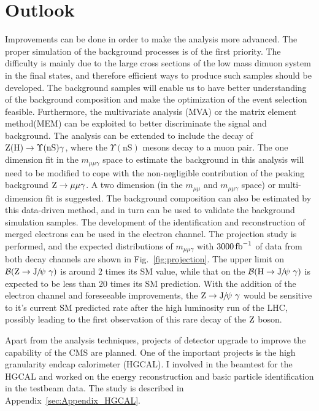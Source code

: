 \section{Outlook}
Improvements can be done in order to make the analysis more advanced. The proper simulation of the background processes is of the first priority. The difficulty is mainly due to the large cross sections of the low mass dimuon system in the final states, and therefore efficient ways to produce such samples should be developed. The background samples will enable us to have better understanding of the background composition and make the optimization of the event selection feasible. Furthermore, the multivariate analysis (MVA) or the matrix element method\footnotemark (MEM) can be exploited to better discriminate the signal and background. 
The analysis can be extended to include the decay of $\mathrm{Z}(\mathrm{H})\to\Upsilon(\text{nS})\gamma$, where the $\Upsilon(\text{nS})$ mesons decay to a muon pair.  The one dimension fit in the $m_{\mu\mu\gamma}$ space to estimate the background in this analysis will need to be modified to cope with the non-negligible contribution of the peaking background $\mathrm{Z}\to\mu\mu\gamma$. A two dimension (in the $m_{\mu\mu}$ and $m_{\mu\mu\gamma}$ space) or multi-dimension fit is suggested. The background composition can also be estimated by this data-driven method, and in turn can be used to validate the background simulation samples. The development of the identification and reconstruction of merged electrons can be used in the electron channel. The projection study is performed, and the expected distributions of $m_{\mu\mu\gamma}$ with $3000\mbox{\ensuremath{\,\text{fb}^\text{$-$1}}}$ of data from both decay channels are shown in Fig.~\ref{fig:projection}. The upper limit on $\mathcal{B}(\mathrm{Z}\to{\mathrm{J}\hspace{-.08em}/\hspace{-.14em}\psi}\ \gamma)$ is around 2 times its SM value, while that on the $\mathcal{B}(\mathrm{H}\to{\mathrm{J}\hspace{-.08em}/\hspace{-.14em}\psi}\ \gamma)$ is expected to be less than 20 times its SM prediction. With the addition of the electron channel and foreseeable improvements, the $\mathrm{Z}\to{\mathrm{J}\hspace{-.08em}/\hspace{-.14em}\psi}\ \gamma$ would be sensitive to it's current SM predicted rate after the high luminosity run of the LHC, possibly leading to the first observation of this rare decay of the $\mathrm{Z}$ boson.

Apart from the analysis techniques, projects of detector upgrade to improve the capability of the CMS are planned. One of the important projects is the high granularity endcap calorimeter (HGCAL). I involved in the beamtest for the HGCAL and worked
on the energy reconstruction and basic particle identification in the testbeam data. The study is described in Appendix~\ref{sec:Appendix_HGCAL}.

